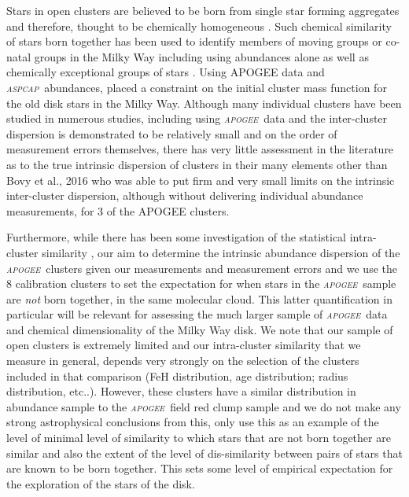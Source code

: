 \documentclass[14pt, preprint2]{aastex6}
\newcommand{\project}[1]{\textsl{#1}}
\newcommand{\apogee}{\project{\textsc{apogee}}}
\newcommand{\aspcap}{\project{\textsc{aspcap}}}
\begin{document}
Stars in open clusters are believed to be born from single star forming aggregates and therefore, thought to be chemically homogeneous \citep[e.g.][]{deSilva2007,deSilva2009}. Such chemical similarity of stars born together has been used to identify members of moving groups or co-natal groups in the Milky Way including using abundances alone \citep[e.g.][]{Majewski2012a, Hogg2016} as well as chemically exceptional groups of stars \citep[e.g.][]{Schiavon2016, Martell2016}.  Using APOGEE data and \aspcap\ abundances, \citet{Ting2016} placed a constraint on the initial cluster mass function for the old disk stars in the Milky Way.  Although many individual clusters have been studied in numerous studies, including using \apogee\ data \citep[e.g.][]{Souto2016, Cuhna2015, F2013} and the inter-cluster dispersion is demonstrated to be relatively small and on the order of measurement errors themselves, there has very little assessment in the literature as to the true intrinsic dispersion of clusters in their many elements other than Bovy et al., 2016 who was able to put firm and very small limits on the intrinsic inter-cluster dispersion, although without delivering individual abundance measurements, for 3 of the APOGEE clusters. 

Furthermore, while there has been some investigation of the statistical intra-cluster similarity \citep[][]{M2014, deSilva2015}, our aim to determine the intrinsic abundance dispersion of the \apogee\ clusters given our measurements and measurement errors and we use the 8 calibration clusters to set the expectation for when stars in the \apogee\ sample are \textit{not} born together, in the same molecular cloud. This latter quantification in particular will be relevant for assessing the much larger sample of \apogee\ data and chemical dimensionality of the Milky Way disk. We note that our sample of open clusters is extremely limited and our intra-cluster similarity that we measure in general, depends very strongly on  the selection of the clusters included in that comparison (FeH distribution, age distribution; radius distribution, etc..). However, these clusters have a similar distribution in abundance sample to the \apogee\ field red clump sample and we do not make any strong astrophysical conclusions from this, only use this as an example of the level of minimal level of similarity to which stars that are not born together are similar and also the extent of the level of dis-similarity between pairs of stars that are known to be born together.  This sets some level of empirical expectation for the exploration of the stars of the disk. 
\end{document}
